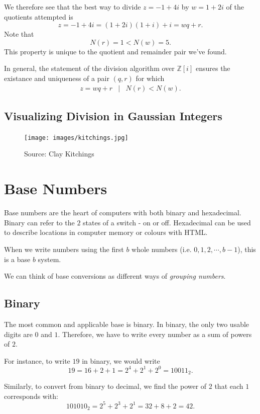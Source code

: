 We therefore see that the best way to divide $z=-1+4i$ by $w=1+2i$ of the quotients attempted is $$z=-1+4i=(1+2i)(1+i)+i=wq+r.$$  Note that $$N(r)=1<N(w)=5.$$  This property is unique to the quotient and remainder pair we've found.  

In general, the statement of the division algorithm over $\mathbb{Z}[i]$ ensures the existance and uniqueness of a pair $(q,r)$ for which  \begin{eqnarray*} z=wq+r &|& N(r)<N(w). \end{eqnarray*}  

\subsection{Visualizing Division in Gaussian Integers}

\begin{figure}[H]
	\centering\texttt{[image: images/kitchings.jpg]}
	\caption{Source:  Clay Kitchings \cite{div:1}}
\end{figure}

\section{Base Numbers}

Base numbers are the heart of computers with both binary and hexadecimal. Binary can refer to the $2$ states of a switch - on or off. Hexadecimal can be used to describe locations in computer memory or colours with HTML.  

\begin{defi} When we write numbers using the first $b$ whole numbers (i.e. $0, 1, 2, \cdots, b-1$), this is a base $b$ system.  \cite{aops:1} \end{defi}

We can think of base conversions as different ways of \textit{grouping numbers}.
\clearpage

\subsection{Binary}

The most common and applicable base is binary. In binary, the only two usable digits are $0$ and $1$. Therefore, we have to write every number as a sum of powers of $2$. 

For instance, to write $19$ in binary, we would write $$19=16+2+1=2^4+2^1+2^0=10011_2.$$  

Similarly, to convert from binary to decimal, we find the power of $2$ that each $1$ corresponds with: $$101010_2=2^5+2^3+2^1=32+8+2=42.$$  

